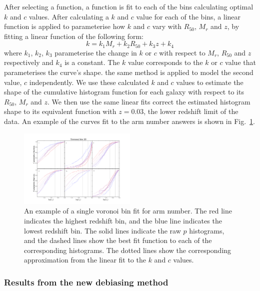 \documentclass[useAMS,usenatbib]{mn2e}
\begin{document}
After selecting a function, a function is fit to each of the bins calculating optimal $k$ and $c$ values. After calculating a $k$ and $c$ value for each of the bins, a linear function is applied to parameterise how $k$ and $c$ vary with $R_{50}$, $M_r$ and $z$, by fitting a linear function of the following form:
\begin{equation}
k = k_1M_r + k_2R_{50} +k_3z + k_4
\end{equation}
where $k_1$, $k_2$, $k_3$ parameterise the change in $k$ or $c$ with respect to $M_r$, $R_{50}$ and $z$ respectively and $k_4$ is a constant. The $k$ value corresponds to the $k$ or $c$ value that parameterises the curve's shape. the same method is applied to model the second value, $c$ independently. We use these calculated $k$ and $c$ values to estimate the shape of the cumulative histogram function for each galaxy with respect to its $R_{50}$, $M_r$ and $z$. We then use the same linear fits  correct the estimated histogram shape to its equivalent function with $z=0.03$, the lower redshift limit of the data. An example of the curves fit to the arm number answers is shown in Fig.~\ref{fig:function_fit}.

\begin{figure}
		\centering

        \includegraphics[width=0.5\textwidth]{Data_imgs/fit_t11_arms_number_vbin20_kcfit1.pdf}

        \caption{An example of a single voronoi bin fit for arm number. The red line indicates the highest redshift bin, and the blue line indicates the lowest redshift bin. The solid lines indicate the raw $p$ histograms, and the dashed lines show the best fit function to each of the corresponding histograms. The dotted lines show the corresponding approximation from the linear fit to the $k$ and $c$ values.}

        \label{fig:function_fit}

\end{figure}

\subsubsection{Results from the new debiasing method}
\end{document}
